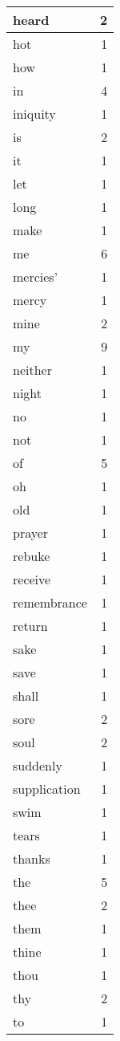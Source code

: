 \begin{center}
\begin{longtable}{l|r}
heard & 2 \\ \hline
hot & 1 \\ \hline
how & 1 \\ \hline
in & 4 \\ \hline
iniquity & 1 \\ \hline
is & 2 \\ \hline
it & 1 \\ \hline
let & 1 \\ \hline
long & 1 \\ \hline
make & 1 \\ \hline
me & 6 \\ \hline
mercies' & 1 \\ \hline
mercy & 1 \\ \hline
mine & 2 \\ \hline
my & 9 \\ \hline
neither & 1 \\ \hline
night & 1 \\ \hline
no & 1 \\ \hline
not & 1 \\ \hline
of & 5 \\ \hline
oh & 1 \\ \hline
old & 1 \\ \hline
prayer & 1 \\ \hline
rebuke & 1 \\ \hline
receive & 1 \\ \hline
remembrance & 1 \\ \hline
return & 1 \\ \hline
sake & 1 \\ \hline
save & 1 \\ \hline
shall & 1 \\ \hline
sore & 2 \\ \hline
soul & 2 \\ \hline
suddenly & 1 \\ \hline
supplication & 1 \\ \hline
swim & 1 \\ \hline
tears & 1 \\ \hline
thanks & 1 \\ \hline
the & 5 \\ \hline
thee & 2 \\ \hline
them & 1 \\ \hline
thine & 1 \\ \hline
thou & 1 \\ \hline
thy & 2 \\ \hline
to & 1 \\ \hline

\end{longtable}
\end{center}
